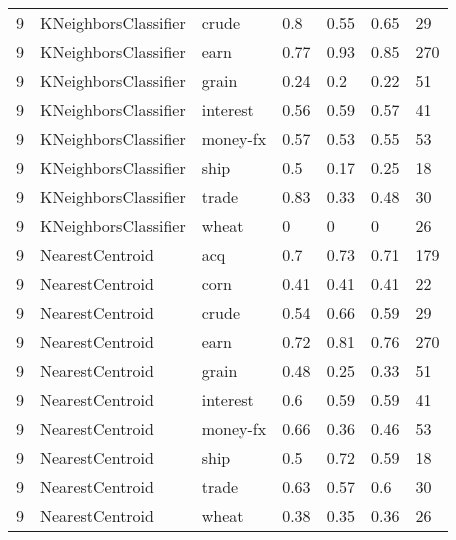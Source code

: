 \documentclass{article}
\begin{document}
\begin{table}[H]
\begin{tabular}{lllllll}
9             & KNeighborsClassifier   & crude           & 0.8                & 0.55            & 0.65              & 29               \\
9             & KNeighborsClassifier   & earn            & 0.77               & 0.93            & 0.85              & 270              \\
9             & KNeighborsClassifier   & grain           & 0.24               & 0.2             & 0.22              & 51               \\
9             & KNeighborsClassifier   & interest        & 0.56               & 0.59            & 0.57              & 41               \\
9             & KNeighborsClassifier   & money-fx        & 0.57               & 0.53            & 0.55              & 53               \\
9             & KNeighborsClassifier   & ship            & 0.5                & 0.17            & 0.25              & 18               \\
9             & KNeighborsClassifier   & trade           & 0.83               & 0.33            & 0.48              & 30               \\
9             & KNeighborsClassifier   & wheat           & 0                  & 0               & 0                 & 26               \\
9             & NearestCentroid        & acq             & 0.7                & 0.73            & 0.71              & 179              \\
9             & NearestCentroid        & corn            & 0.41               & 0.41            & 0.41              & 22               \\
9             & NearestCentroid        & crude           & 0.54               & 0.66            & 0.59              & 29               \\
9             & NearestCentroid        & earn            & 0.72               & 0.81            & 0.76              & 270              \\
9             & NearestCentroid        & grain           & 0.48               & 0.25            & 0.33              & 51               \\
9             & NearestCentroid        & interest        & 0.6                & 0.59            & 0.59              & 41               \\
9             & NearestCentroid        & money-fx        & 0.66               & 0.36            & 0.46              & 53               \\
9             & NearestCentroid        & ship            & 0.5                & 0.72            & 0.59              & 18               \\
9             & NearestCentroid        & trade           & 0.63               & 0.57            & 0.6               & 30               \\
9             & NearestCentroid        & wheat           & 0.38               & 0.35            & 0.36              & 26               \\\end{tabular}
\end{table}
\end{document}
